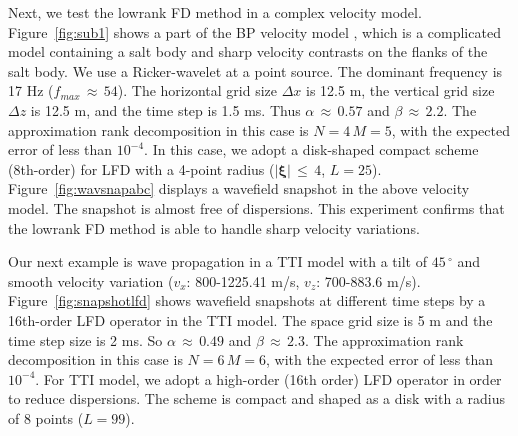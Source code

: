
Next, we test the lowrank FD method in a complex velocity model.
Figure~\ref{fig:sub1} shows a part of the BP velocity model \cite[]{bp}, which is a complicated model containing a salt body and sharp velocity contrasts on the flanks of the salt body. 
We use a Ricker-wavelet at a point source. The dominant frequency is 17 Hz ($f_{max}\,\approx\,54$). 
The horizontal grid size $\Delta x$ is 12.5 m, the vertical grid size $\Delta z$ is 12.5 m, and the time step is 1.5 ms.
Thus $\alpha\,\approx\,0.57$ and $\beta\,\approx\,2.2$. 
The approximation
rank decomposition in this case is $N=4\, M=5$, with the expected error of
less than $10^{-4}$.
In this case, we adopt a disk-shaped compact scheme (8th-order) for LFD with a 4-point radius ($|\mathbf{\xi}|\,\le\,4$, $L=25$). 
Figure~\ref{fig:wavsnapabc} displays a wavefield snapshot in the above velocity model.
The snapshot is almost free of dispersions. 
This experiment confirms that the lowrank FD method is able to handle sharp velocity variations.


Our next example is wave propagation in a TTI model with a tilt of $45\,^{\circ}$ and smooth velocity variation ($v_x$: 800-1225.41 m/s, $v_z$: 700-883.6 m/s). 
Figure~\ref{fig:snapshotlfd} shows wavefield snapshots at different time steps by a 16th-order LFD operator 
in the TTI model. 
The space grid size is 5 m and the time step size is 2 ms.
So $\alpha\,\approx\,0.49$ and $\beta\,\approx\,2.3$.
The approximation
rank decomposition in this case is $N=6\, M=6$, with the expected error of
less than $10^{-4}$.
For TTI model, we adopt a high-order (16th order) LFD operator in order to reduce dispersions. 
The scheme is compact and shaped as a disk with a radius of 8 points ($L=99$).

